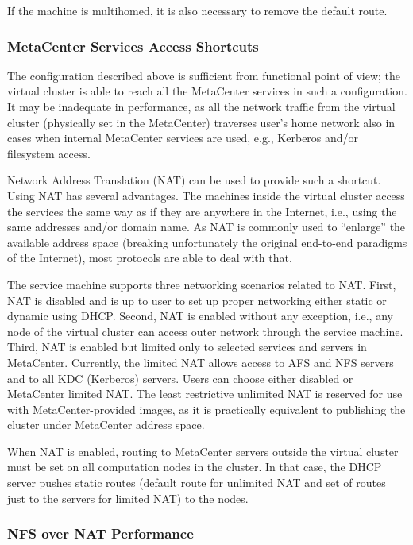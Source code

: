 \documentclass[a4paper]{article}
\begin{document}
If the machine is multihomed, it is also necessary to remove the default
route.

\subsubsection{MetaCenter Services Access Shortcuts}

The configuration described above is sufficient from functional point of
view; the virtual cluster is able to reach all the MetaCenter services in
such a configuration. It may be inadequate in performance, as all the
network traffic from the virtual cluster (physically set in the MetaCenter)
traverses user's home network also in cases when internal MetaCenter
services are used, e.g., Kerberos and/or filesystem access.

Network Address Translation (NAT) can be used to provide such a shortcut.
Using NAT has several advantages.
The machines inside the virtual cluster access the services the same way as
if they are anywhere in the Internet, i.e., using the same addresses and/or
domain name. As
NAT is commonly used to ``enlarge'' the available address
space (breaking unfortunately the original end-to-end paradigms of the
Internet), most protocols are able to deal with that.

The service machine supports three networking scenarios related to NAT. First,
NAT is disabled and is up to user to set up proper networking either static or
dynamic using DHCP. Second, NAT is enabled without any exception, i.e., any
node of the virtual cluster can access outer network through the service
machine. Third, NAT is enabled but limited only to selected services and
servers in MetaCenter. Currently, the limited NAT allows access to AFS
and NFS servers and to all KDC (Kerberos) servers. Users can choose either
disabled or MetaCenter limited NAT. The least restrictive unlimited NAT is
reserved for use with MetaCenter-provided images, as it is practically
equivalent to publishing the cluster under MetaCenter address space.

When NAT is enabled, routing to MetaCenter servers outside the virtual
cluster must be set on all computation nodes in the cluster. In that case,
the DHCP server pushes static routes (default route for unlimited NAT and
set of routes just to the servers for limited NAT) to the nodes.

\subsubsection{NFS over NAT Performance}
\end{document}
